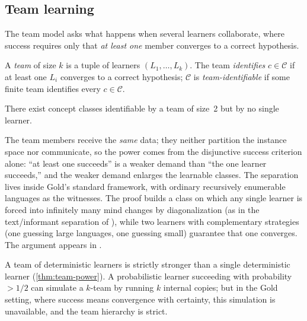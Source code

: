 \subsection{Team learning}

The team model asks what happens when several learners collaborate, where success requires only that \emph{at least one} member converges to a correct hypothesis.

\begin{defn}
\label{def:team-learner}
A \emph{team} of size $k$ is a tuple of learners $(L_1, \ldots, L_k)$. The team \emph{identifies} $c \in \mathcal{C}$ if at least one $L_i$ converges to a correct hypothesis; $\mathcal{C}$ is \emph{team-identifiable} if some finite team identifies every $c \in \mathcal{C}$.
\end{defn}

\begin{thm}
\label{thm:team-power}
There exist concept classes identifiable by a team of size~2 but by no single learner.
\end{thm}

The team members receive the \emph{same} data; they neither partition the instance space nor communicate, so the power comes from the disjunctive success criterion alone: ``at least one succeeds'' is a weaker demand than ``the one learner succeeds,'' and the weaker demand enlarges the learnable classes. The separation lives inside Gold's standard framework, with ordinary recursively enumerable languages as the witnesses. The proof builds a class on which any single learner is forced into infinitely many mind changes by diagonalization (as in the text/informant separation of ), while two learners with complementary strategies (one guessing large languages, one guessing small) guarantee that one converges. The argument appears in .

\begin{remark}
\label{rmk:team-prob}
A team of deterministic learners is strictly stronger than a single deterministic learner (\cref{thm:team-power}). A probabilistic learner succeeding with probability $> 1/2$ can simulate a $k$-team by running $k$ internal copies; but in the Gold setting, where success means convergence with certainty, this simulation is unavailable, and the team hierarchy is strict.
\end{remark}

